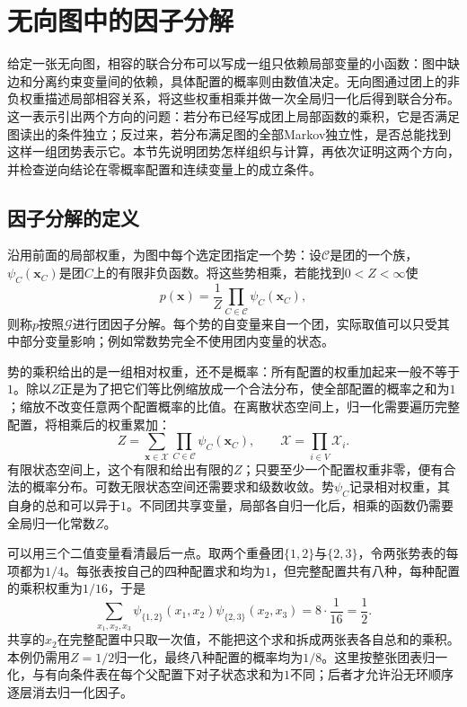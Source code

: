 \section{无向图中的因子分解}
\label{sec:pgm-undirected-factorization}

给定一张无向图，相容的联合分布可以写成一组只依赖局部变量的小函数：图中缺边和分离约束变量间的依赖，具体配置的概率则由数值决定。无向图通过团上的非负权重描述局部相容关系，将这些权重相乘并做一次全局归一化后得到联合分布。这一表示引出两个方向的问题：若分布已经写成团上局部函数的乘积，它是否满足图读出的条件独立；反过来，若分布满足图的全部Markov独立性，是否总能找到这样一组团势表示它。本节先说明团势怎样组织与计算，再依次证明这两个方向，并检查逆向结论在零概率配置和连续变量上的成立条件。

\subsection{因子分解的定义}
\label{sec:pgm-undirected-factorization-definition}

沿用前面的局部权重，为图中每个选定团指定一个势：设$\mathcal{C}$是团的一个族，$\psi_C(\bm{x}_C)$是团$C$上的有限非负函数。将这些势相乘，若能找到$0<Z<\infty$使
\begin{equation}
  p(\bm{x})=\frac{1}{Z}\prod_{C\in\mathcal{C}}\psi_C(\bm{x}_C),
  \label{eq:pgm-undirected-factorization}
\end{equation}
则称$p$按照$\mathcal{G}$进行团因子分解。每个势的自变量来自一个团，实际取值可以只受其中部分变量影响；例如常数势完全不使用团内变量的状态。

势的乘积给出的是一组相对权重，还不是概率：所有配置的权重加起来一般不等于$1$。除以$Z$正是为了把它们等比例缩放成一个合法分布，使全部配置的概率之和为$1$；缩放不改变任意两个配置概率的比值。在离散状态空间上，归一化需要遍历完整配置，将相乘后的权重累加：
\begin{equation}
  Z=\sum_{\bm{x}\in\mathcal{X}}\prod_{C\in\mathcal{C}}\psi_C(\bm{x}_C),
  \qquad
  \mathcal{X}=\prod_{i\in V}\mathcal{X}_i.
  \label{eq:pgm-undirected-partition}
\end{equation}
有限状态空间上，这个有限和给出有限的$Z$；只要至少一个配置权重非零，便有合法的概率分布。可数无限状态空间还需要求和级数收敛。势$\psi_C$记录相对权重，其自身的总和可以异于$1$。不同团共享变量，局部各自归一化后，相乘的函数仍需要全局归一化常数$Z$。

可以用三个二值变量看清最后一点。取两个重叠团$\{1,2\}$与$\{2,3\}$，令两张势表的每项都为$1/4$。每张表按自己的四种配置求和均为$1$，但完整配置共有八种，每种配置的乘积权重为$1/16$，于是
\[
  \sum_{x_1,x_2,x_3}
    \psi_{\{1,2\}}(x_1,x_2)\psi_{\{2,3\}}(x_2,x_3)
  =8\cdot\frac{1}{16}=\frac12.
\]
共享的$x_2$在完整配置中只取一次值，不能把这个求和拆成两张表各自总和的乘积。本例仍需用$Z=1/2$归一化，最终八种配置的概率均为$1/8$。这里按整张团表归一化，与有向条件表在每个父配置下对子状态求和为$1$不同；后者才允许沿无环顺序逐层消去归一化因子。

